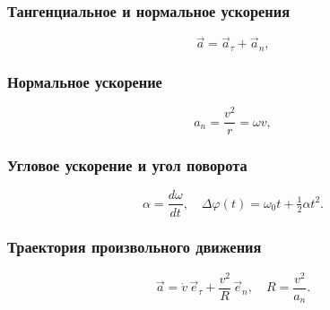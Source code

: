\documentclass[12pt, a4paper]{article}
\begin{document}
\subsubsection*{Тангенциальное и нормальное ускорения}

\[
\vec a = \vec a_\tau + \vec a_n,
\]

\subsubsection*{Нормальное ускорение}

\[
a_n = \frac{v^2}{r} = \omega v,
\]

\subsubsection*{Угловое ускорение и угол поворота}

\[
\alpha = \frac{d\omega}{dt}, \quad
\Delta \varphi(t) = \omega_0 t + \tfrac12 \alpha t^2.
\]

\subsubsection*{Траектория произвольного движения}

\[
\vec a = \dot v\,\vec e_\tau + \frac{v^2}{R}\,\vec e_n,
\quad
R = \frac{v^2}{a_n}.
\]
\end{document}
